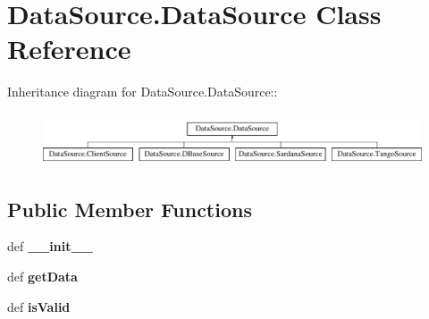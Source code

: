 \hypertarget{classDataSource_1_1DataSource}{
\section{DataSource.DataSource Class Reference}
\label{classDataSource_1_1DataSource}
}
Inheritance diagram for DataSource.DataSource::\begin{figure}[H]
\begin{center}
\leavevmode
\includegraphics[height=1.55556cm]{classDataSource_1_1DataSource}
\end{center}
\end{figure}
\subsection*{Public Member Functions}
\begin{DoxyCompactItemize}
\item 
\hypertarget{classDataSource_1_1DataSource_a7ce54db00fe71393732da4cfc8d57473}{
def {\bfseries \_\-\_\-init\_\-\_\-}}
\label{classDataSource_1_1DataSource_a7ce54db00fe71393732da4cfc8d57473}

\item 
\hypertarget{classDataSource_1_1DataSource_abdd2f8aee9ac7903189095438b71615a}{
def {\bfseries getData}}
\label{classDataSource_1_1DataSource_abdd2f8aee9ac7903189095438b71615a}

\item 
\hypertarget{classDataSource_1_1DataSource_aff51edc77d07a3ba978438c6532e7788}{
def {\bfseries isValid}}
\label{classDataSource_1_1DataSource_aff51edc77d07a3ba978438c6532e7788}

\end{DoxyCompactItemize}
